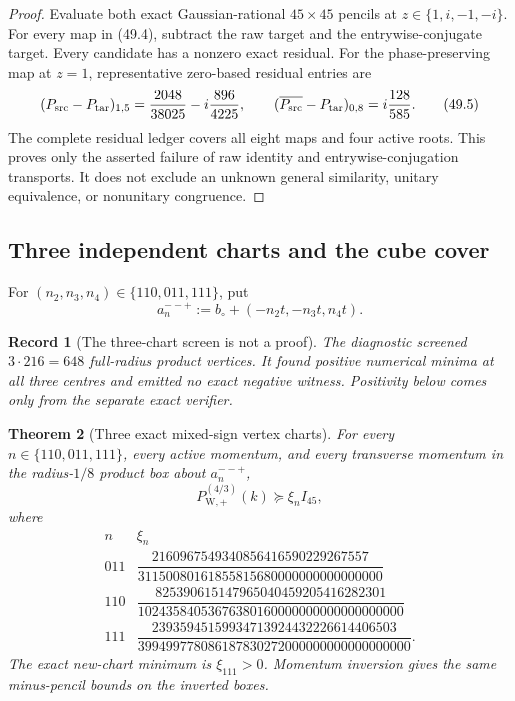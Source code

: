 \documentclass[11pt,oneside]{article}
\newtheorem{theorem}{Theorem}[section]
\newtheorem{record}[theorem]{Record}
\theoremstyle{definition}
\theoremstyle{remark}
\begin{document}
\begin{proof}
Evaluate both exact Gaussian-rational \(45\times45\) pencils at
\(z\in\{1,i,-1,-i\}\).  For every map in (49.4), subtract the raw
target and the entrywise-conjugate target.  Every candidate has a
nonzero exact residual.  For the phase-preserving map at \(z=1\),
representative zero-based residual entries are
\[
 (P_{\rm src}-P_{\rm tar})_{1,5}
 =\frac{2048}{38025}-i\frac{896}{4225},\qquad
 (\overline{P_{\rm src}}-P_{\rm tar})_{0,8}
 =i\frac{128}{585}.                                    \tag{49.5}
\]
The complete residual ledger covers all eight maps and four active
roots.  This proves only the asserted failure of raw identity and
entrywise-conjugation transports.  It does not exclude an unknown
general similarity, unitary equivalence, or nonunitary congruence.
\end{proof}

\subsection{Three independent charts and the cube cover}

For \((n_2,n_3,n_4)\in\{110,011,111\}\), put
\[
 a_n^{--+}:=b_\circ+(-n_2t,-n_3t,n_4t).               \tag{49.6}
\]

\begin{record}[The three-chart screen is not a proof]
\label{rec:newv49-screen}
The diagnostic screened \(3\cdot216=648\) full-radius product
vertices.  It found positive numerical minima at all three centres
and emitted no exact negative witness.  Positivity below comes
only from the separate exact verifier.
\end{record}

\begin{theorem}[Three exact mixed-sign vertex charts]
\label{thm:newv49-three-charts}
For every \(n\in\{110,011,111\}\), every active momentum, and every
transverse momentum in the radius-\(1/8\) product box about
\(a_n^{--+}\),
\[
 P_{\mathrm W,+}^{(4/3)}(k)\succeq\xi_n I_{45},       \tag{49.7}
\]
where
\[
\begin{array}{c|c}
n&\xi_n\\ \hline
011&\dfrac{2160967549340856416590229267557}
{31150080161855815680000000000000000}\\[5pt]
110&\dfrac{825390615147965040459205416282301}
{10243584053676380160000000000000000000}\\[5pt]
111&\dfrac{23935945159934713924432226614406503}
{399499778086187830272000000000000000000}.
\end{array}                                             \tag{49.8}
\]
The exact new-chart minimum is \(\xi_{111}>0\).  Momentum inversion
gives the same minus-pencil bounds on the inverted boxes.
\end{theorem}
\end{document}
